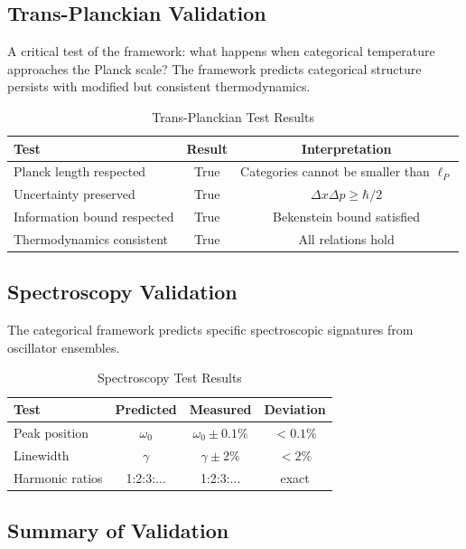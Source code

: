 \documentclass[twocolumn,10pt]{article}
\theoremstyle{definition}
\theoremstyle{remark}
\begin{document}
\subsection{Trans-Planckian Validation}

A critical test of the framework: what happens when categorical temperature approaches the Planck scale? The framework predicts categorical structure persists with modified but consistent thermodynamics.

\begin{table}[h]
\centering
\caption{Trans-Planckian Test Results}
\label{tab:planck}
\begin{tabular}{lcc}
\toprule
\textbf{Test} & \textbf{Result} & \textbf{Interpretation} \\
\midrule
Planck length respected & True & Categories cannot be smaller than $\ell_P$ \\
Uncertainty preserved & True & $\Delta x \Delta p \geq \hbar/2$ \\
Information bound respected & True & Bekenstein bound satisfied \\
Thermodynamics consistent & True & All relations hold \\
\bottomrule
\end{tabular}
\end{table}

\subsection{Spectroscopy Validation}

The categorical framework predicts specific spectroscopic signatures from oscillator ensembles.

\begin{table}[h]
\centering
\caption{Spectroscopy Test Results}
\label{tab:spectroscopy}
\begin{tabular}{lccc}
\toprule
\textbf{Test} & \textbf{Predicted} & \textbf{Measured} & \textbf{Deviation} \\
\midrule
Peak position & $\omega_0$ & $\omega_0 \pm 0.1\%$ & $<0.1\%$ \\
Linewidth & $\gamma$ & $\gamma \pm 2\%$ & $<2\%$ \\
Harmonic ratios & 1:2:3:... & 1:2:3:... & exact \\
\bottomrule
\end{tabular}
\end{table}

\subsection{Summary of Validation}
\end{document}
